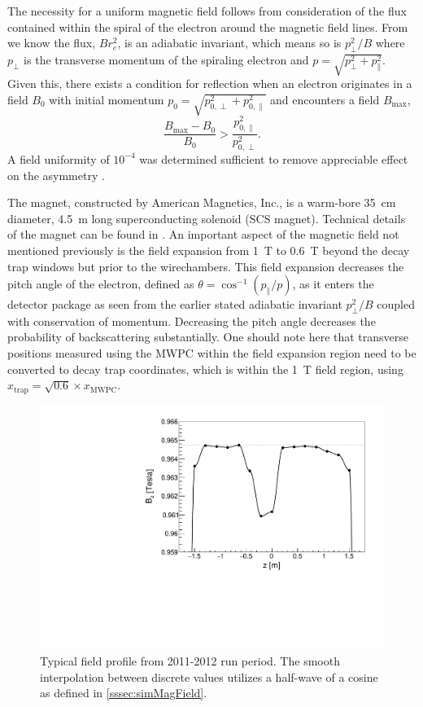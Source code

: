The necessity for a uniform magnetic field follows from consideration of the flux contained
within the spiral of the electron around the magnetic field lines. From \cite{jackson1999}
we know the flux, $Br_e^2$, is an adiabatic invariant, which means so is $p_\perp^2/B$ where
$p_\perp$ is the transverse momentum of the spiraling electron and $p = \sqrt{p_\perp^2+p_\parallel^2}$.
Given this, there exists a condition for reflection when an electron originates in a field $B_0$
with initial momentum $p_0 = \sqrt{p_{0,\perp}^2+p_{0,\parallel}^2}$
and encounters a field $B_{\mathrm{max}}$,
%
\begin{equation}
  \frac{B_{\mathrm{max}}-B_0}{B_0} > \frac{p^2_{0,\parallel}}{p^2_{0,\perp}}.
  \label{eq:fieldReflection}
\end{equation}
%
A field uniformity of $10^{-4}$ was determined sufficient to remove appreciable effect
on the asymmetry \cite{plaster2008solenoidal}.

The magnet, constructed by American Magnetics, Inc., is a warm-bore 35~cm diameter, 4.5~m
long superconducting solenoid (SCS magnet). Technical details of the magnet can be found in
\cite{plaster2008solenoidal, plaster2012}. An important aspect of the magnetic field not mentioned
previously is the field expansion from 1~T to 0.6~T beyond the decay trap windows but prior to
the wirechambers. This field expansion decreases the pitch angle of the electron,
defined as
$\theta = \cos^{-1}(p_{\parallel}/p)$, as it
enters the detector package as seen from the earlier stated adiabatic invariant $p_\perp^2/B$
coupled with conservation of momentum. Decreasing the pitch angle decreases the probability
of backscattering substantially. One should note here that transverse positions measured using the MWPC
within the field expansion region need to be converted to decay trap coordinates, which is within
the 1~T field region, using $x_{\mathrm{trap}} = \sqrt{0.6} \times x_{\mathrm{MWPC}}$.

\begin{figure}[h]
  \centering
  \includegraphics[scale=0.5]{2-UCNAExperiment/magField.pdf} 
  \caption{Typical field profile from 2011-2012 run period. The smooth interpolation between discrete values utilizes a half-wave of a cosine as defined in \ref{sssec:simMagField}.}
  \label{fig:field_profile}
\end{figure}

